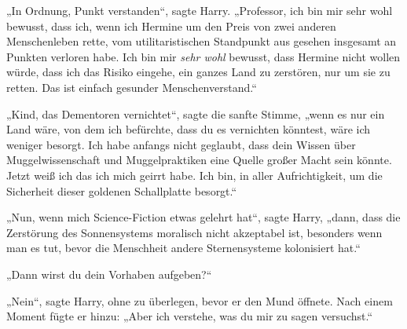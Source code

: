 „In Ordnung, Punkt verstanden“, sagte Harry. „Professor, ich bin mir sehr wohl bewusst, dass ich, wenn ich Hermine um den Preis von zwei anderen Menschenleben rette, vom utilitaristischen Standpunkt aus gesehen insgesamt an Punkten verloren habe. Ich bin mir \emph{sehr wohl} bewusst, dass Hermine nicht wollen würde, dass ich das Risiko eingehe, ein ganzes Land zu zerstören, nur um sie zu retten. Das ist einfach gesunder Menschenverstand.“

„Kind, das Dementoren vernichtet“, sagte die sanfte Stimme, „wenn es nur ein Land wäre, von dem ich befürchte, dass du es vernichten könntest, wäre ich weniger besorgt. Ich habe anfangs nicht geglaubt, dass dein Wissen über Muggelwissenschaft und Muggelpraktiken eine Quelle großer Macht sein könnte. Jetzt weiß ich das ich mich geirrt habe. Ich bin, in aller Aufrichtigkeit, um die Sicherheit dieser goldenen Schallplatte besorgt.“

„Nun, wenn mich Science-Fiction etwas gelehrt hat“, sagte Harry, „dann, dass die Zerstörung des Sonnensystems moralisch nicht akzeptabel ist, besonders wenn man es tut, bevor die Menschheit andere Sternensysteme kolonisiert hat.“

„Dann wirst du dein Vorhaben aufgeben?“

„Nein“, sagte Harry, ohne zu überlegen, bevor er den Mund öffnete. Nach einem Moment fügte er hinzu: „Aber ich verstehe, was du mir zu sagen versuchst.“


